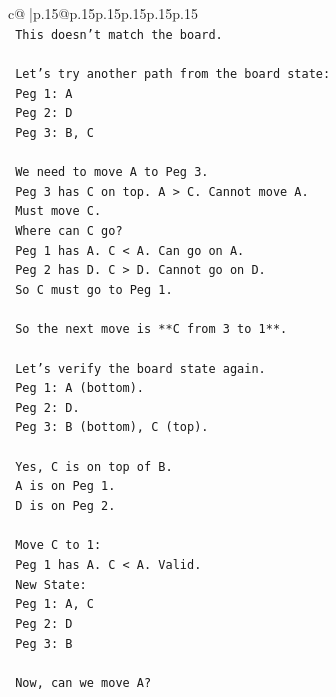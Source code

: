 \documentclass{article}
\begin{document}
{\begin{supertabular}{c@{$\;$}|p{.15\linewidth}@{}p{.15\linewidth}p{.15\linewidth}p{.15\linewidth}p{.15\linewidth}p{.15\linewidth}}
{{{\\ 
\texttt{            This doesn't match the board.} \\
\\ 
\texttt{            Let's try another path from the board state:} \\
\texttt{            Peg 1: A} \\
\texttt{            Peg 2: D} \\
\texttt{            Peg 3: B, C} \\
\\ 
\texttt{            We need to move A to Peg 3.} \\
\texttt{            Peg 3 has C on top. A > C. Cannot move A.} \\
\texttt{            Must move C.} \\
\texttt{            Where can C go?} \\
\texttt{            Peg 1 has A. C < A. Can go on A.} \\
\texttt{            Peg 2 has D. C > D. Cannot go on D.} \\
\texttt{            So C must go to Peg 1.} \\
\\ 
\texttt{            So the next move is **C from 3 to 1**.} \\
\\ 
\texttt{            Let's verify the board state again.} \\
\texttt{            Peg 1: A (bottom).} \\
\texttt{            Peg 2: D.} \\
\texttt{            Peg 3: B (bottom), C (top).} \\
\\ 
\texttt{            Yes, C is on top of B.} \\
\texttt{            A is on Peg 1.} \\
\texttt{            D is on Peg 2.} \\
\\ 
\texttt{            Move C to 1:} \\
\texttt{            Peg 1 has A. C < A. Valid.} \\
\texttt{            New State:} \\
\texttt{            Peg 1: A, C} \\
\texttt{            Peg 2: D} \\
\texttt{            Peg 3: B} \\
\\ 
\texttt{            Now, can we move A?} \\
}}}
\end{supertabular}}
\end{document}
